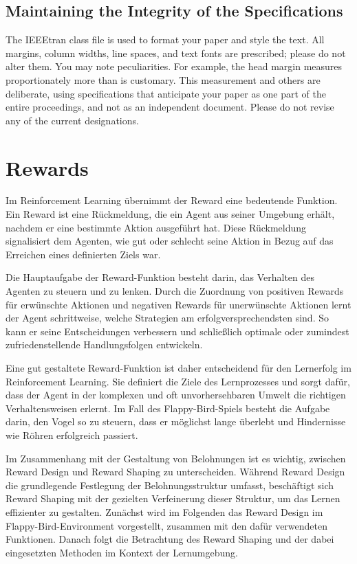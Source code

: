 \documentclass[conference]{IEEEtran}
\begin{document}
\subsection{Maintaining the Integrity of the Specifications}

The IEEEtran class file is used to format your paper and style the text. All margins, 
column widths, line spaces, and text fonts are prescribed; please do not 
alter them. You may note peculiarities. For example, the head margin
measures proportionately more than is customary. This measurement 
and others are deliberate, using specifications that anticipate your paper 
as one part of the entire proceedings, and not as an independent document. 
Please do not revise any of the current designations.

\section{Rewards}
Im Reinforcement Learning übernimmt der Reward eine bedeutende Funktion. Ein Reward ist eine Rückmeldung, die ein Agent aus seiner Umgebung erhält, nachdem er eine bestimmte Aktion ausgeführt hat. Diese Rückmeldung signalisiert dem Agenten, wie gut oder schlecht seine Aktion in Bezug auf das Erreichen eines definierten Ziels war.

Die Hauptaufgabe der Reward-Funktion besteht darin, das Verhalten des Agenten zu steuern und zu lenken. Durch die Zuordnung von positiven Rewards für erwünschte Aktionen und negativen Rewards für unerwünschte Aktionen lernt der Agent schrittweise, welche Strategien am erfolgversprechendsten sind. So kann er seine Entscheidungen verbessern und schließlich optimale oder zumindest zufriedenstellende Handlungsfolgen entwickeln.

Eine gut gestaltete Reward-Funktion ist daher entscheidend für den Lernerfolg im Reinforcement Learning. Sie definiert die Ziele des Lernprozesses und sorgt dafür, dass der Agent in der komplexen und oft unvorhersehbaren Umwelt die richtigen Verhaltensweisen erlernt. Im Fall des Flappy-Bird-Spiels besteht die Aufgabe darin, den Vogel so zu steuern, dass er möglichst lange überlebt und Hindernisse wie Röhren erfolgreich passiert.

Im Zusammenhang mit der Gestaltung von Belohnungen ist es wichtig, zwischen Reward Design und Reward Shaping zu unterscheiden. Während Reward Design die grundlegende Festlegung der Belohnungsstruktur umfasst, beschäftigt sich Reward Shaping mit der gezielten Verfeinerung dieser Struktur, um das Lernen effizienter zu gestalten. Zunächst wird im Folgenden das Reward Design im Flappy-Bird-Environment vorgestellt, zusammen mit den dafür verwendeten Funktionen. Danach folgt die Betrachtung des Reward Shaping und der dabei eingesetzten Methoden im Kontext der Lernumgebung.
\end{document}
